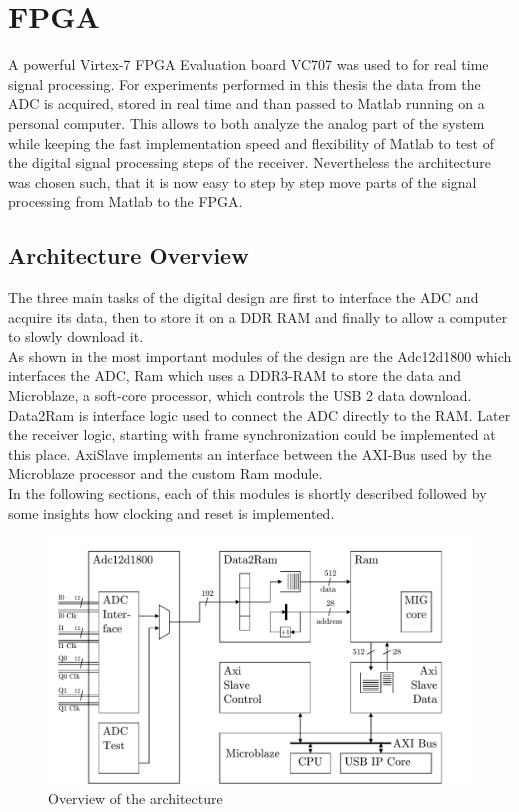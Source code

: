 \chapter{FPGA}
\label{chap:fpga}
A powerful Virtex-7 \gls{FPGA} Evaluation board VC707
was used to for real time signal processing.
For experiments performed in this thesis
the data from the \gls{ADC} is acquired, stored in real time
and than passed to Matlab running on a personal computer.
This allows to both analyze the analog part of the system
while keeping the fast implementation speed and flexibility of Matlab
to test of the digital signal processing steps of the receiver.
Nevertheless the architecture was chosen such, that it is now easy
to step by step move parts of the signal processing from Matlab to the
\gls{FPGA}. \\

\section{Architecture Overview}
The three main tasks of the digital design are first to interface
the \gls{ADC} and acquire its data, then to store it on a
\gls{DDR} \gls{RAM} and finally to allow a computer to
slowly download it. \\

As shown in  the most important
modules of the design are the Adc12d1800 which interfaces the
\gls{ADC}, Ram which uses a \gls{DDR}3-\gls{RAM} to store the data
and Microblaze, a soft-core processor, which controls the
\gls{USB} 2 data download. Data2Ram is interface logic used
to connect the \gls{ADC} directly to the \gls{RAM}. Later the receiver logic,
starting with frame synchronization could be implemented
at this place. AxiSlave implements an interface between the
\gls{AXI}-Bus used by the Microblaze processor and the custom
Ram module. \\

In the following sections, each of this modules is shortly described followed
by some insights how clocking and reset is implemented. \\

\begin{figure}[ht]
  \centering
  \includegraphics[width=\textwidth]{figures/fpga_architecture_overview}
  \caption{Overview of the architecture}
  \label{fig:fpga_architecture_overview}
\end{figure}

